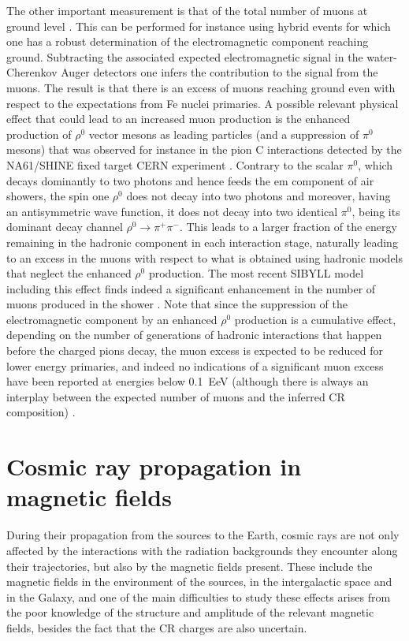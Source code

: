 \documentclass[twoside,12pt]{article}
\begin{document}
The other important measurement is that of the total number of muons at ground level \cite{nmuauger}. This can be performed for instance using hybrid events for which one has a robust determination of the electromagnetic component reaching ground. Subtracting the associated expected electromagnetic signal in the water-Cherenkov Auger detectors one infers the contribution to the signal from the muons. The result is that there is an excess of muons reaching ground even with respect to the expectations from Fe nuclei primaries. A possible relevant physical effect that could lead to an increased muon production is the enhanced production of $\rho^0$ vector mesons as leading particles (and a suppression of $\pi^0$ mesons) that was observed for instance in the pion C interactions detected by the NA61/SHINE fixed target CERN experiment \cite{rho0}. Contrary to the scalar $\pi^0$, which decays dominantly to two photons and hence feeds the em component of air showers, the spin one $\rho^0$ does not decay into two photons and moreover, having an antisymmetric wave function, it does not decay into two identical $\pi^0$, being its dominant decay channel $\rho^0\to\pi^+\pi^-$. 
This leads to a larger fraction of the energy remaining in the hadronic component in each interaction stage, 
 naturally leading to an excess in the muons with respect to what is  obtained using hadronic models that neglect the enhanced $\rho^0$ production. The most recent SIBYLL model including this effect finds indeed a significant enhancement in the number of muons produced in the shower \cite{sibyll3}. Note that since the suppression of the electromagnetic component by an enhanced $\rho^0$ production is a cumulative effect, depending on the number of generations of hadronic interactions that happen before the charged pions decay, the muon excess is expected to be reduced for lower energy primaries, and indeed no indications of a significant muon excess have been reported at energies below 0.1~EeV  (although there is always an interplay between  the expected number of muons and the inferred CR composition) \cite{msu17,ic17}. 

\section{Cosmic ray propagation in magnetic fields}

During their propagation from the sources to the Earth, cosmic rays are not only affected by the interactions with the radiation backgrounds they encounter along their trajectories, but also by the magnetic fields present. These include the magnetic fields in the environment of the sources, in the intergalactic space and in the Galaxy, and one of the  main difficulties to study these effects arises from the poor knowledge of the structure and amplitude of the relevant magnetic fields, besides the fact that the CR charges are also uncertain.
\end{document}
